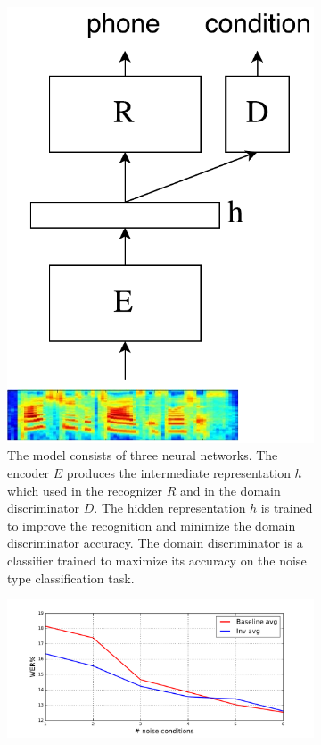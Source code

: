 \documentclass{article}
\begin{document}
\begin{figure}
    \centering
    \begin{subfigure}[b]{0.3\linewidth}
        \centering
        \includegraphics[width=0.9\linewidth]{model.pdf}
        \caption{The model consists of three neural networks. The encoder $E$ produces
        the intermediate representation $h$ which used in the recognizer $R$ and 
        in the domain discriminator $D$. The hidden representation $h$ is trained to improve
        the recognition and minimize the domain discriminator accuracy. The domain discriminator
        is a classifier trained to maximize its accuracy on the noise type
        classification task.}
        \label{fig:model}
    \end{subfigure}%
    \begin{subfigure}[b]{0.7\linewidth}
        \centering
        \includegraphics[width=\linewidth]{wer_avg.pdf}

\end{subfigure}
\end{figure}
\end{document}
